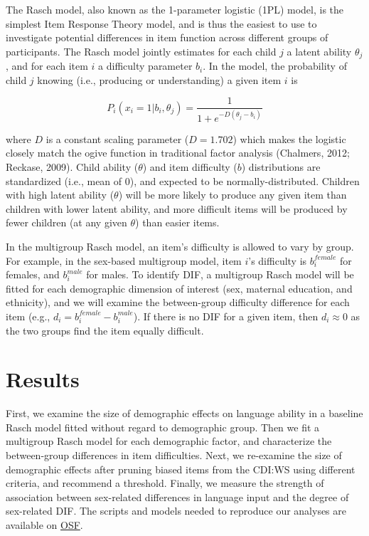 \documentclass[10pt, letterpaper]{article}
\begin{document}
The Rasch model, also known as the 1-parameter logistic (1PL) model, is
the simplest Item Response Theory model, and is thus the easiest to use
to investigate potential differences in item function across different
groups of participants. The Rasch model jointly estimates for each child
\(j\) a latent ability \(\theta_j\), and for each item \(i\) a
difficulty parameter \(b_i\). In the model, the probability of child
\(j\) knowing (i.e., producing or understanding) a given item \(i\) is

\[P_{i}(x_i = 1 | b_{i},\theta_j ) = \frac{1}{1 + e^{-D(\theta_j - b_i )}}\]

\noindent where \(D\) is a constant scaling parameter (\(D=1.702\))
which makes the logistic closely match the ogive function in traditional
factor analysis (Chalmers, 2012; Reckase, 2009). Child ability
(\(\theta\)) and item difficulty (\(b\)) distributions are standardized
(i.e., mean of 0), and expected to be normally-distributed. Children
with high latent ability (\(\theta\)) will be more likely to produce any
given item than children with lower latent ability, and more difficult
items will be produced by fewer children (at any given \(\theta\)) than
easier items.

In the multigroup Rasch model, an item's difficulty is allowed to vary
by group. For example, in the sex-based multigroup model, item \(i\)'s
difficulty is \(b_{i}^{female}\) for females, and \(b_{i}^{male}\) for
males. To identify DIF, a multigroup Rasch model will be fitted for each
demographic dimension of interest (sex, maternal education, and
ethnicity), and we will examine the between-group difficulty difference
for each item (e.g., \(d_i = b_{i}^{female} - b_{i}^{male}\)). If there
is no DIF for a given item, then \(d_i \approx 0\) as the two groups
find the item equally difficult.

\hypertarget{results}{%
\section{Results}\label{results}}

First, we examine the size of demographic effects on language ability in
a baseline Rasch model fitted without regard to demographic group. Then
we fit a multigroup Rasch model for each demographic factor, and
characterize the between-group differences in item difficulties. Next,
we re-examine the size of demographic effects after pruning biased items
from the CDI:WS using different criteria, and recommend a threshold.
Finally, we measure the strength of association between sex-related
differences in language input and the degree of sex-related DIF. The
scripts and models needed to reproduce our analyses are available on
\href{https://osf.io/57rsw/?view_only=2b6ecb61fe08458293af7421d276932a}{OSF}.
\end{document}
